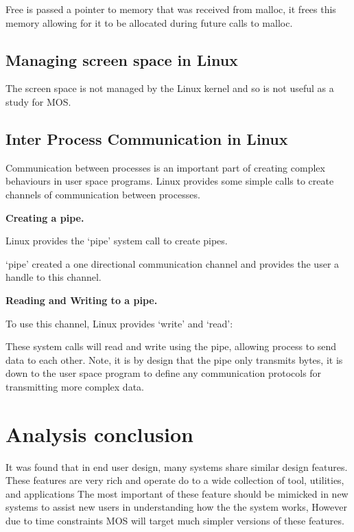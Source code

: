 \documentclass[a4paper]{report}
\begin{document}
Free is passed a pointer to memory that was received from malloc, it frees this memory allowing for it to be allocated during future calls to malloc.


\subsection{Managing screen space in Linux}

The screen space is not managed by the Linux kernel and so is not useful as a study for MOS.

\subsection{Inter Process Communication in Linux}

Communication between processes is an important part of creating complex behaviours in user space programs. Linux provides some simple calls to create channels of communication between processes.

\noindent
\textbf{Creating a pipe.}

Linux provides the `pipe' system call to create pipes. \cite{manPipe}

`pipe' created a one directional communication channel and provides the user a handle to this channel.

\noindent
\textbf{Reading and Writing to a pipe.}

To use this channel, Linux provides `write' and `read': \cite{manWrite} \cite{manRead}

These system calls will read and write using the pipe, allowing process to send data to each other. Note, it is by design that the pipe only transmits bytes, it is down to the user space program to define any communication protocols for transmitting more complex data.

\section{Analysis conclusion}

It was found that in end user design, many systems share similar design features. These features are very rich and operate do to a wide collection of tool, utilities, and applications The most important of these feature should be mimicked in new systems to assist new users in understanding how the the system works, However due to time constraints MOS will target much simpler versions of these features.
\end{document}
